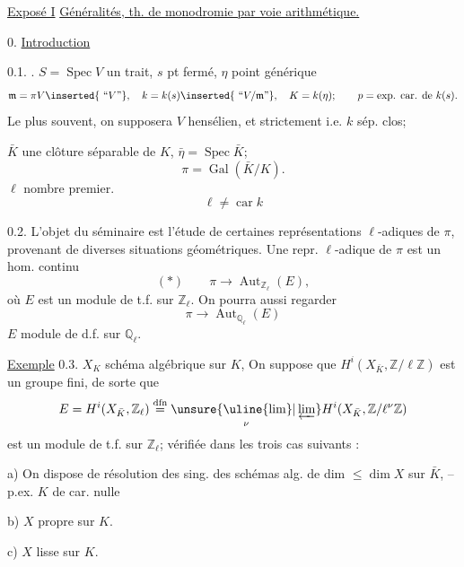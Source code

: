 \uline{Exposé I}\qquad{}
\uline{Généralités,  th. de monodromie par voie arithmétique.}

0. \uline{Introduction}

0.1. \uline{}. $S=\operatorname{Spec}V$ un trait, $s$ pt fermé, $\eta$ point générique
\[
\mathfrak m=\pi V\inserted{\text{ ``}V\text{''}},\quad k=k(s)\inserted{\text{ ``}V/\mathfrak m\text{''}},\quad K=k(\eta);\qquad p=\text{exp. car. de }k(s).
\]
Le plus souvent, on supposera $V$ hensélien, et  strictement  i.e. $k$ sép. clos;

 $\bar K$ une clôture séparable de $K$, $\bar\eta=\operatorname{Spec}\bar K$;
\[
\pi=\operatorname{Gal}(\bar K/K).
\]
$\ell$ nombre premier.   
\[
\ell\neq\operatorname{car}k
\]

0.2. L'objet du séminaire est l'étude de certaines représentations $\ell$-adiques de $\pi$, provenant de diverses situations géométriques. Une repr. $\ell$-adique de $\pi$ est un  hom. continu
\[
(*)\qquad\pi\longrightarrow\operatorname{Aut}_{\mathbb Z_\ell}(E),
\]
où $E$ est un module de t.f. sur $\mathbb Z_\ell$. On pourra aussi regarder
\[
\pi\longrightarrow\operatorname{Aut}_{\mathbb Q_\ell}(E)
\]
$E$ module de d.f. sur $\mathbb Q_\ell$.

\uline{Exemple} 0.3. $X_K$ schéma algébrique sur $K$,  On suppose que $H^i(X_{\bar K},\mathbb Z/\ell\mathbb Z)$ est un groupe fini, de sorte que
\[
E=H^i(X_{\bar K},\mathbb Z_\ell)\overset{\mathrm{dfn}}=\underset{\nu}{\unsure{\uline{\lim}|\varprojlim}}H^i(X_{\bar K},\mathbb Z/\ell^\nu\mathbb Z)
\]
est un module de t.f. sur $\mathbb Z_\ell$;   vérifiée dans les trois cas suivants :

a) On dispose de résolution des sing.  des schémas alg. de dim $\leq\dim X$ sur $\bar K$, -- p.ex. $K$ de car. nulle

b) $X$ propre sur $K$.

c) $X$ lisse sur $K$.
